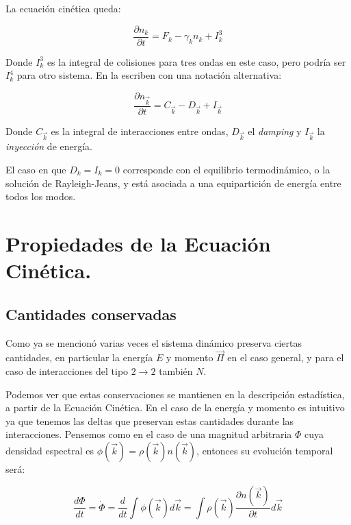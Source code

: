 La ecuación cinética queda:

\begin{equation}
	\frac{\partial n_k}{\partial t} = F_k - \gamma_k n_k + I_k^3  
\end{equation}

Donde $I^3_k$ es la integral de colisiones para tres ondas en este caso, pero podría ser $I_k^4$ para otro sistema. En \cite{falconLaboratoryExperimentsWave2010} la escriben con una notación alternativa:

\begin{equation}
	\frac{\partial n_{\vec k}}{\partial t} = C_{\vec k} - D_{\vec k} + I_{\vec k}
\end{equation}

Donde $C_{\vec k}$ es la integral de interacciones entre ondas, $D_{\vec k}$ el \textit{damping} y $I_{\vec k}$ la \textit{inyección} de energía.

El caso en que $D_k=I_k=0$ corresponde con el equilibrio termodinámico, o la solución de Rayleigh-Jeans, y está asociada a una equipartición de energía entre todos los modos.


\section*{Propiedades de la Ecuación Cinética.}
\subsection*{Cantidades conservadas}
Como ya se mencionó varias veces el sistema dinámico preserva ciertas cantidades, en particular la energía $E$ y momento $\vec \Pi$ en el caso general, y para el caso de interacciones del tipo $2\rightarrow2$ también $N$.

Podemos ver que estas conservaciones se mantienen en la descripción estadística, a partir de la Ecuación Cinética. En el caso de la energía y momento es intuitivo ya que tenemos las deltas que preservan estas cantidades durante las interacciones. Pensemos como \cite{nazarenkoWaveTurbulence2011} en el caso de una magnitud arbitraria $\Phi$ cuya densidad espectral es $\phi(\vec k) = \rho(\vec k)n(\vec k)$, entonces su evolución temporal será:

\begin{equation}
	\frac{d\Phi}{dt} = \dot \Phi = \frac{d}{dt}\int\phi(\vec k)d\vec k = \int \rho(\vec k)\frac{\partial n(\vec k)}{\partial t}d\vec k
\end{equation}

